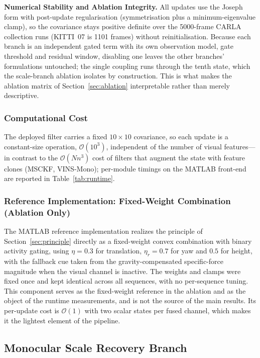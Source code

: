 \textbf{Numerical Stability and Ablation Integrity.} All updates use the Joseph form with post-update regularisation (symmetrisation plus a minimum-eigenvalue clamp), so the covariance stays positive definite over the 5000-frame CARLA collection runs (KITTI~07 is 1101 frames) without reinitialisation. Because each branch is an independent gated term with its own observation model, gate threshold and residual window, disabling one leaves the other branches' formulations untouched; the single coupling runs through the tenth state, which the scale-branch ablation isolates by construction. This is what makes the ablation matrix of Section~\ref{sec:ablation} interpretable rather than merely descriptive.

\subsubsection{Computational Cost}
\label{sec:cost}

The deployed filter carries a fixed $10\times10$ covariance, so each update is a constant-size operation, $\mathcal{O}(10^{3})$, independent of the number of visual features---in contrast to the $\mathcal{O}(Nn^{3})$ cost of filters that augment the state with feature clones (MSCKF, VINS-Mono); per-module timings on the MATLAB front-end are reported in Table~\ref{tab:runtime}.

\subsubsection{Reference Implementation: Fixed-Weight Combination (Ablation Only)}
\label{sec:reference_impl}

The MATLAB reference implementation realizes the principle of Section~\ref{sec:principle} directly as a fixed-weight convex combination with binary activity gating, using $\eta=0.3$ for translation, $\eta_r=0.7$ for yaw and $0.5$ for height, with the fallback cue taken from the gravity-compensated specific-force magnitude when the visual channel is inactive. The weights and clamps were fixed once and kept identical across all sequences, with no per-sequence tuning. This component serves as the fixed-weight reference in the ablation and as the object of the runtime measurements, and is not the source of the main results. Its per-update cost is $\mathcal{O}(1)$ with two scalar states per fused channel, which makes it the lightest element of the pipeline.

\subsection{Monocular Scale Recovery Branch}
\label{sec:scale_recovery}

